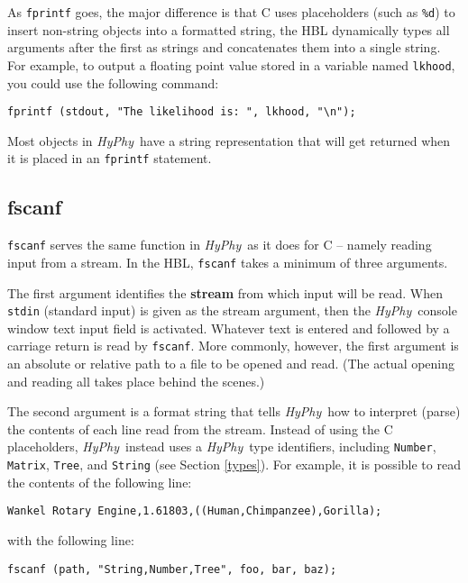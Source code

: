 \documentclass[12pt,twoside,openright]{book}
\newcommand{\hyphy}{\textit{HyPhy}}
\begin{document}
As {\tt fprintf} goes, the major difference is that C uses placeholders (such as {\tt \%d}) to insert non-string objects into a formatted string, the HBL dynamically types all arguments after the first as strings and concatenates them into a single string.  For example, to output a floating point value stored in a variable named {\tt lkhood}, you could use the following command:

\begin{leftbar}
\begin{verbatim}
fprintf (stdout, "The likelihood is: ", lkhood, "\n");
\end{verbatim}
\end{leftbar}

Most objects in \hyphy\ have a string representation that will get returned when it is placed in an {\tt fprintf} statement.  

\subsection {fscanf}

{\tt fscanf} serves the same function in \hyphy\ as it does for C -- namely reading input from a stream.  In the HBL, {\tt fscanf} takes a minimum of three arguments.  

The first argument identifies the {\bf stream} from which input will be read.  When {\tt stdin} (standard input) is given as the stream argument, then the \hyphy\ console window text input field is activated.  Whatever text is entered and followed by a carriage return is read by {\tt fscanf}.  More commonly, however, the first argument is an absolute or relative path to a file to be opened and read.  (The actual opening and reading all takes place behind the scenes.)  

The second argument is a format string that tells \hyphy\ how to interpret (parse) the contents of each line read from the stream.  Instead of using the C placeholders, \hyphy\ instead uses a \hyphy\ type identifiers, including {\tt Number}, {\tt Matrix}, {\tt Tree}, and {\tt String} (see Section \ref{types}).  For example, it is possible to read the contents of the following line:

\begin{verbatim}
Wankel Rotary Engine,1.61803,((Human,Chimpanzee),Gorilla);
\end{verbatim}

\noindent with the following line:

\begin{leftbar}
\begin{verbatim}
fscanf (path, "String,Number,Tree", foo, bar, baz);
\end{verbatim}
\end{leftbar}
\end{document}
